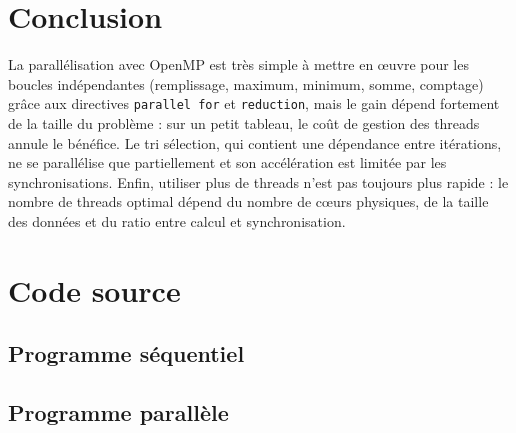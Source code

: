\documentclass[11pt,a4paper]{article}
\begin{document}
\section{Conclusion}

La parallélisation avec OpenMP est très simple à mettre en \oe uvre pour les boucles indépendantes (remplissage, maximum, minimum, somme, comptage) grâce aux directives \texttt{parallel for} et \texttt{reduction}, mais le gain dépend fortement de la taille du problème : sur un petit tableau, le coût de gestion des threads annule le bénéfice. Le tri sélection, qui contient une dépendance entre itérations, ne se parallélise que partiellement et son accélération est limitée par les synchronisations. Enfin, utiliser plus de threads n'est pas toujours plus rapide : le nombre de threads optimal dépend du nombre de c\oe urs physiques, de la taille des données et du ratio entre calcul et synchronisation.

\appendix

\section{Code source}

\subsection{Programme séquentiel}


\subsection{Programme parallèle}

\end{document}
